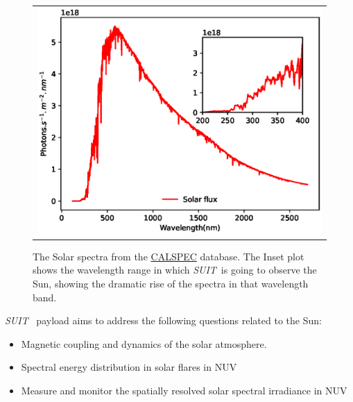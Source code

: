 \documentclass[12pt]{spieman}  %
\newcommand{\suit}{{\it{SUIT}}}
\begin{document}
\begin{figure}[ht!]
\begin{center}
\begin{tabular}{c}
\includegraphics[width=0.8\linewidth]{spectrum_sun.eps}
\end{tabular}
\end{center}
\caption 
{ \label{fig:sun_spec} The Solar spectra from the \href{https://www.stsci.edu/hst/instrumentation/reference-data-for-calibration-and-tools/astronomical-catalogs/calspec}{CALSPEC} database. The Inset plot shows the wavelength range in which \suit~is going to observe the Sun, showing the dramatic rise of the spectra in that wavelength band.} 
\end{figure} 

\suit~ payload aims to address the following questions related to the Sun:

\begin{itemize}
    \item Magnetic coupling and dynamics of the solar atmosphere.
    \item Spectral energy distribution in solar flares in NUV
    \item Measure and monitor the spatially resolved solar spectral irradiance in NUV
\end{itemize}
\end{document}
